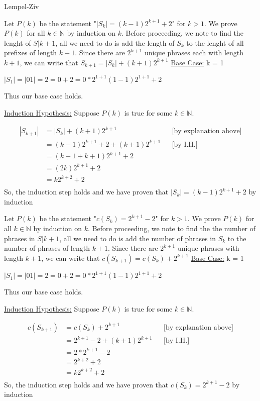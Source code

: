 \documentclass[11pt, nopagenumbers]{adamblan-hw}
\newcommand{\NN}{\mathbb{N}}
\begin{document}
\begin{question}{\color{red} Lempel-Ziv}
\pagebreak
\begin{part}
Let $P(k)$ be the statement "$|S_k| = (k - 1) 2^{k + 1} + 2$" for $k > 1$. We prove $P(k)$ for all $k \in \NN$ by induction on $k$.
Before proceeding, we note to find the lenght of $S|{k + 1}$, all we need to do is add the length of $S_k$
to the lenght of all prefixes of length $k + 1$. Since there are $2^{k + 1}$ unique phrases each with length $k + 1$, 
we can write that $S_{k + 1} = |S_k| + (k + 1)2^{k + 1}$
\underline{Base Case:} k = 1

$|S_1| = |01| = 2 = 0 + 2 = 0 * 2^{1+1} (1 - 1) 2^{1 + 1} + 2$

Thus our base case holds.

\underline{Induction Hypothesis:} Suppose $P(k)$ is true for some $k \in \NN$.

\begin{align*}
|S_{k + 1}| &= |S_k| + (k + 1) 2^{k + 1} && \text{[by explanation above]}\\
& = (k - 1)2^{k + 1} + 2 + (k + 1) 2^{k + 1} && \text{[by I.H.]}\\
& = (k - 1 + k + 1)2^{k + 1} + 2 \\
& = (2k)2^{k + 1} + 2 \\
& = k2^{k + 2} + 2 \\
\end{align*}
So, the induction step holds and we have proven that $|S_k| = (k - 1) 2^{k + 1} + 2$ by induction
\end{part}

\pagebreak
\begin{part}
Let $P(k)$ be the statement "$c(S_k) = 2^{k + 1} - 2$" for $k > 1$. We prove $P(k)$ for all $k \in \NN$ by induction on $k$.
Before proceeding, we note to find the the number of phrases in $S|{k + 1}$, all we need to do is add the number of phrases in $S_k$
to the number of phrases of length $k + 1$. Since there are $2^{k + 1}$ unique phrases with length $k + 1$, 
we can write that $c(S_{k + 1}) = c(S_k) + 2^{k + 1}$
\underline{Base Case:} k = 1

$|S_1| = |01| = 2 = 0 + 2 = 0 * 2^{1+1} (1 - 1) 2^{1 + 1} + 2$

Thus our base case holds.

\underline{Induction Hypothesis:} Suppose $P(k)$ is true for some $k \in \NN$.

\begin{align*}
c(S_{k + 1}) &= c(S_k) + 2^{k + 1} && \text{[by explanation above]}\\
& = 2^{k + 1} - 2 + (k + 1) 2^{k + 1} && \text{[by I.H.]}\\
& = 2 * 2^{k + 1} - 2 \\
& = 2^{k + 2} + 2 \\
& = k2^{k + 2} + 2 \\
\end{align*}
So, the induction step holds and we have proven that $c(S_k) = 2^{k + 1} - 2$ by induction
\end{part}


\end{question}
\end{document}
